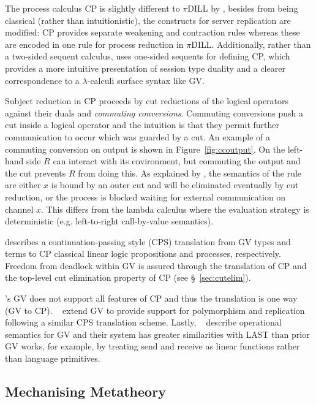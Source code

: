 The process calculus CP is slightly different to $\pi$DILL by
\citeauthor{Caires:2010:STI}, besides from being classical (rather than
intuitionistic), the constructs for server replication are modified: CP
provides separate weakening and contraction rules whereas these are encoded in
one rule for process reduction in $\pi$DILL. Additionally, rather than a
two-sided sequent calculus, \citeauthor{Wadler:2014} uses one-sided sequents
for defining CP, which provides a more intuitive presentation of session type
duality and a clearer correspondence to a $\lambda$-calculi surface syntax
like GV.



Subject reduction in CP proceeds by cut reductions of the logical operators
against their duals and \textit{commuting conversions}. Commuting conversions
push a cut inside a logical operator and the intuition is that they permit
further communication to occur which was guarded by a cut. An example of a
commuting conversion on output is shown in Figure~\ref{fig:ccoutput}. On the
left-hand side $R$ can interact with its environment, but commuting the output
and the cut prevents $R$ from doing this. As explained by
\citeauthor{Wadler:2014}, the semantics of the rule are either $x$ is bound by
an outer cut and will be eliminated eventually by cut reduction, or the
process is blocked waiting for external communication on channel $x$. This
differs from the lambda calculus where the evaluation strategy is
deterministic (e.g. left-to-right call-by-value semantics).

\citeauthor{Wadler:2014} describes a continuation-passing style (CPS)
translation from GV types and terms to CP classical linear logic propositions
and processes, respectively. Freedom from deadlock within GV is assured
through the translation of CP and the top-level cut elimination property of CP
(see \S~\ref{sec:cutelim}).

\citeauthor{Wadler:2014}'s GV does not support all features of CP and thus the
translation is one way (GV to
CP). \citeauthor{Lindley:2014:SAP}~\cite{Lindley:2014:SAP} extend GV to
provide support for polymorphism and replication following a similar CPS
translation scheme. Lastly,
\citeauthor{Lindley:2014:SPS}~\cite{Lindley:2014:SPS} describe operational
semantics for GV and their system has greater similarities with LAST than
prior GV works, for example, by treating send and receive as linear functions
rather than language primitives.

\subsection{Mechanising Metatheory}

